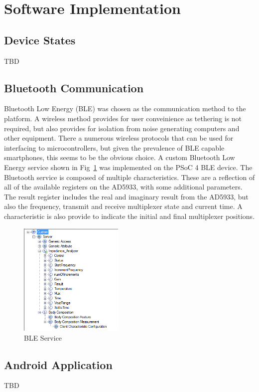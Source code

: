 \documentclass[]{IEEEtran}
\begin{document}
\section{Software Implementation}
\subsection{Device States}
TBD
\subsection{Bluetooth Communication}

Bluetooth Low Energy (BLE) was chosen as the communication method to the platform. A wireless method provides for user conveinience as tethering is not required, but also provides for isolation from noise generating computers and other equipment. There a numerous wireless protocols that can be used for interfacing to microcontrollers, but given the prevalence of BLE capable smartphones, this seems to be the obvious choice. A custom Bluetooth Low Energy service shown in Fig~\ref{fig:ble} was implemented on the PSoC 4 BLE device. The Bluetooth service is composed of multiple characteristics. These are a reflection of all of the available registers on the AD5933, with some additional parameters. The result register includes the real and imaginary result from the AD5933, but also the frequency, transmit and receive multiplexer state and current time. A characteristic is also provide to indicate the initial and final multiplexer positions.  

\begin{figure} %
\centering
\includegraphics[width=5cm ]{../graphics/ble_service.png}
\centering
\caption{BLE Service}
\label{fig:ble}
\end{figure}



\subsection{Android Application}
TBD
\end{document}
